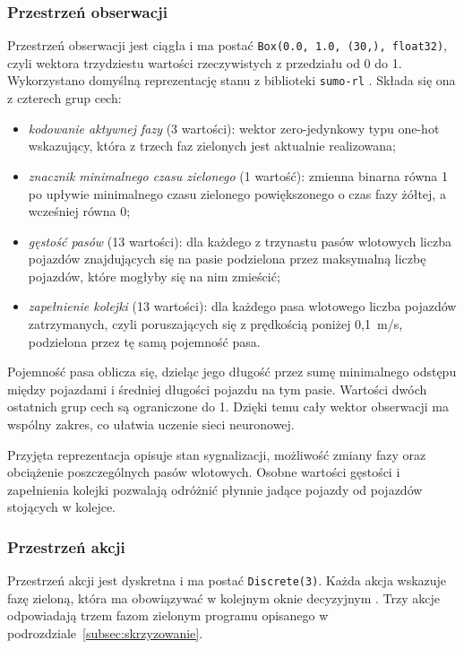 \subsubsection{Przestrzeń obserwacji}
\label{subsubsec:obserwacja}

Przestrzeń obserwacji jest ciągła i ma postać \texttt{Box(0.0, 1.0, (30,), float32)}, czyli wektora trzydziestu wartości rzeczywistych z przedziału od 0 do 1. Wykorzystano domyślną reprezentację stanu z biblioteki \texttt{sumo-rl} \cite{alegre2019sumorl}. Składa się ona z czterech grup cech:
\begin{itemize}
    \item \emph{kodowanie aktywnej fazy} (3 wartości): wektor zero-jedynkowy typu one-hot wskazujący, która z trzech faz zielonych jest aktualnie realizowana;
    \item \emph{znacznik minimalnego czasu zielonego} (1 wartość): zmienna binarna równa 1 po upływie minimalnego czasu zielonego powiększonego o czas fazy żółtej, a wcześniej równa 0;
    \item \emph{gęstość pasów} (13 wartości): dla każdego z trzynastu pasów wlotowych liczba pojazdów znajdujących się na pasie podzielona przez maksymalną liczbę pojazdów, które mogłyby się na nim zmieścić;
    \item \emph{zapełnienie kolejki} (13 wartości): dla każdego pasa wlotowego liczba pojazdów zatrzymanych, czyli poruszających się z prędkością poniżej 0,1~m/s, podzielona przez tę samą pojemność pasa.
\end{itemize}

Pojemność pasa oblicza się, dzieląc jego długość przez sumę minimalnego odstępu między pojazdami i średniej długości pojazdu na tym pasie. Wartości dwóch ostatnich grup cech są ograniczone do 1. Dzięki temu cały wektor obserwacji ma wspólny zakres, co ułatwia uczenie sieci neuronowej.

Przyjęta reprezentacja opisuje stan sygnalizacji, możliwość zmiany fazy oraz obciążenie poszczególnych pasów wlotowych. Osobne wartości gęstości i zapełnienia kolejki pozwalają odróżnić płynnie jadące pojazdy od pojazdów stojących w kolejce.

\subsubsection{Przestrzeń akcji}
\label{subsubsec:akcje}

Przestrzeń akcji jest dyskretna i ma postać \texttt{Discrete(3)}. Każda akcja wskazuje fazę zieloną, która ma obowiązywać w kolejnym oknie decyzyjnym \cite{alegre2019sumorl}. Trzy akcje odpowiadają trzem fazom zielonym programu opisanego w podrozdziale~\ref{subsec:skrzyzowanie}.


